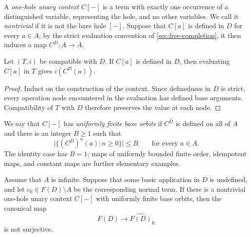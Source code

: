 A \emph{one-hole unary context} $C[-]$ is a term with exactly one occurrence of
a distinguished variable, representing the hole, and no other variables.  We
call it \emph{nontrivial} if it is not the bare hole $[-]$.  Suppose that
$C[a]$ is defined in $D$ for every $a\in A$; by the strict evaluation
convention of \cref{sec:free-completion}, it then induces a map
$C^D:A\to A$.

\begin{lemma}\label{lem:context-compatibility}
Let $(T,i)$ be compatible with $D$.  If $C[a]$ is defined in $D$, then
evaluating $C[a]$ in $T$ gives $i(C^D(a))$.
\end{lemma}

\begin{proof}
Induct on the construction of the context.  Since definedness in $D$ is strict,
every operation node encountered in the evaluation has defined base arguments.
Compatibility of $T$ with $D$ therefore preserves the value at each node.
\end{proof}

We say that $C[-]$ has \emph{uniformly finite base orbits} if $C^D$ is defined
on all of $A$ and there is an integer $B\ge1$ such that
\[
 \bigl|\{(C^D)^n(a):n\ge0\}\bigr|\le B
 \qquad\text{for every }a\in A.
\]
The identity case has $B=1$; maps of uniformly bounded finite order,
idempotent maps, and constant maps are further elementary examples.

\begin{theorem}
\label{thm:infinite-base-criterion}
Assume that $A$ is infinite.  Suppose that some basic application in $D$ is
undefined, and let $c_0\in F(D)\setminus A$ be the corresponding normal term.
If there is a nontrivial one-hole unary context $C[-]$ with uniformly finite
base orbits, then the canonical map
\[
 F(D)\longrightarrow\widehat{F(D)}_{\mathrm{fc}}
\]
is not surjective.
\end{theorem}

